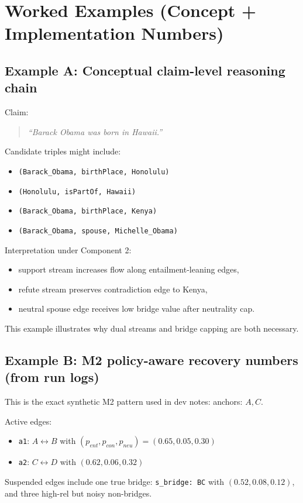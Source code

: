 \section{Worked Examples (Concept + Implementation Numbers)}
\label{sec:examples}

\subsection{Example A: Conceptual claim-level reasoning chain}
Claim:
\begin{quote}
\textit{``Barack Obama was born in Hawaii.''}
\end{quote}
Candidate triples might include:
\begin{itemize}
\item \texttt{(Barack\_Obama, birthPlace, Honolulu)}
\item \texttt{(Honolulu, isPartOf, Hawaii)}
\item \texttt{(Barack\_Obama, birthPlace, Kenya)}
\item \texttt{(Barack\_Obama, spouse, Michelle\_Obama)}
\end{itemize}

Interpretation under Component 2:
\begin{itemize}
\item support stream increases flow along entailment-leaning edges,
\item refute stream preserves contradiction edge to Kenya,
\item neutral spouse edge receives low bridge value after neutrality cap.
\end{itemize}
This example illustrates why dual streams and bridge capping are both necessary.

\subsection{Example B: M2 policy-aware recovery numbers (from run logs)}
This is the exact synthetic M2 pattern used in dev notes:
anchors: $A, C$.

Active edges:
\begin{itemize}
\item \texttt{a1}: $A\leftrightarrow B$ with $(p_{ent},p_{con},p_{neu})=(0.65,0.05,0.30)$
\item \texttt{a2}: $C\leftrightarrow D$ with $(0.62,0.06,0.32)$
\end{itemize}

Suspended edges include one true bridge:
\texttt{s\_bridge: B\leftrightarrow C} with $(0.52,0.08,0.12)$,
and three high-rel but noisy non-bridges.

